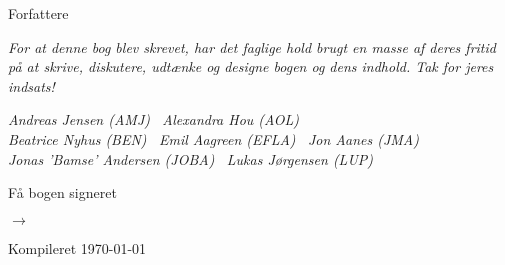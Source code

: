 \cleardoublepage
\begin{titlepage}
	\centering
	\vspace{3cm}
	{\Huge Forfattere \par} \vspace{0.5cm}
	{\small\itshape For at denne bog blev skrevet, har det faglige hold brugt en masse af deres fritid på at skrive, diskutere, udtænke og designe bogen og dens indhold. Tak for jeres indsats!\par} \vspace{0.75cm}
	{\itshape Andreas Jensen (AMJ) \, Alexandra Hou (AOL) \\ 
		Beatrice Nyhus (BEN) \, Emil Aagreen (EFLA) \, Jon Aanes (JMA) \\ 
		Jonas 'Bamse' Andersen (JOBA) \, Lukas Jørgensen (LUP)\par}
	\vfill
	{\large Få bogen signeret\par} \vspace{0.5cm}
	{\fontsize{50}{80} $\rightarrow$\par} \vspace{2cm}
	{Kompileret \today\par}
\end{titlepage}
